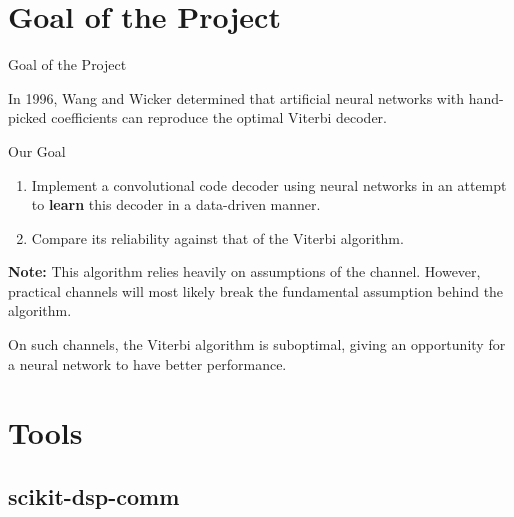 \documentclass{beamer}
\newcommand{\<}				{\langle}
\renewcommand{\>}      		{\rangle}
\begin{document}
\section{Goal of the Project}

\begin{frame}{Goal of the Project}

In 1996, Wang and Wicker determined that artificial neural networks with hand-picked coefficients can reproduce the optimal Viterbi decoder.

\medskip

\begin{block}{Our Goal}
\begin{enumerate}
\item Implement a convolutional code decoder using neural networks in an attempt to \textbf{learn} this decoder in a data-driven manner. 
\item Compare its reliability against that of the Viterbi algorithm.
\end{enumerate}
\end{block}

\textbf{Note:} This algorithm relies heavily on assumptions of the channel. However, practical channels will most likely break the fundamental assumption behind the algorithm. 

\medskip

On such channels, the Viterbi algorithm is suboptimal, giving an opportunity for a neural network to have better performance.

\end{frame}

\section{Tools} 

\subsection{scikit-dsp-comm} 
\end{document}
